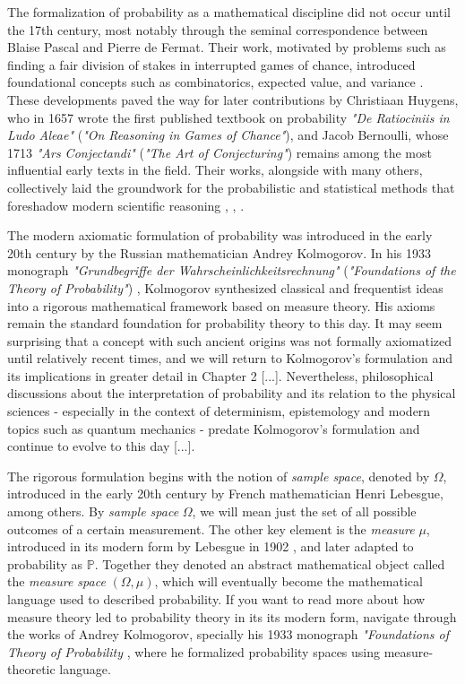 \documentclass{book}
\begin{document}
\medskip

The formalization of probability as a mathematical discipline did not occur until the 17th century, most notably through the seminal correspondence between Blaise Pascal and Pierre de Fermat. Their work, motivated by problems such as finding a fair division of stakes in interrupted games of chance, introduced foundational concepts such as combinatorics, expected value, and variance \cite{devlin2008unfinished}. These developments paved the way for later contributions by Christiaan Huygens, who in 1657 wrote the first published textbook on probability \textit{"De Ratiociniis in Ludo Aleae"} (\textit{"On Reasoning in Games of Chance"}), and Jacob Bernoulli, whose 1713 \textit{"Ars Conjectandi"} (\textit{"The Art of Conjecturing"}) remains among the most influential early texts in the field. Their works, alongside with many others, collectively laid the groundwork for the probabilistic and statistical methods that foreshadow modern scientific reasoning \cite{huygens1657ratiociniis}, \cite{bernoulli1713ars}, \cite{hald1990history}.

\medskip

The modern axiomatic formulation of probability was introduced in the early 20th century by the Russian mathematician Andrey Kolmogorov. In his 1933 monograph \textit{"Grundbegriffe der Wahrscheinlichkeitsrechnung"} (\textit{"Foundations of the Theory of Probability"}) \cite{kolmogorov1933grundbegriffe}, Kolmogorov synthesized classical and frequentist ideas into a rigorous mathematical framework based on measure theory. His axioms remain the standard foundation for probability theory to this day. It may seem surprising that a concept with such ancient origins was not formally axiomatized until relatively recent times, and we will return to Kolmogorov’s formulation and its implications in greater detail in Chapter 2 [...]. Nevertheless, philosophical discussions about the interpretation of probability and its relation to the physical sciences - especially in the context of determinism, epistemology and modern topics such as quantum mechanics - predate Kolmogorov's formulation and continue to evolve to this day [...].

\medskip

The rigorous formulation begins with the notion of \textit{sample space}, denoted by $\Omega$, introduced in the early 20th century by French mathematician Henri Lebesgue, among others. By \textit{sample space} $\Omega$, we will mean just the set of all possible outcomes of a certain measurement. The other key element is the \textit{measure} $\mu$, introduced in its modern form by Lebesgue in 1902 \cite{lebesgue1902}, and later adapted to probability as $\mathbb{P}$. Together they denoted an abstract mathematical object called the \textit{measure space} $(\Omega, \mu)$, which will eventually become the mathematical language used to described probability. If you want to read more about how measure theory led to probability theory in its its modern form, navigate through the works of Andrey Kolmogorov, specially his 1933 monograph \textit{"Foundations of Theory of Probability} \cite{kolmogorov1933}, where he formalized probability spaces using measure-theoretic language.
\end{document}
